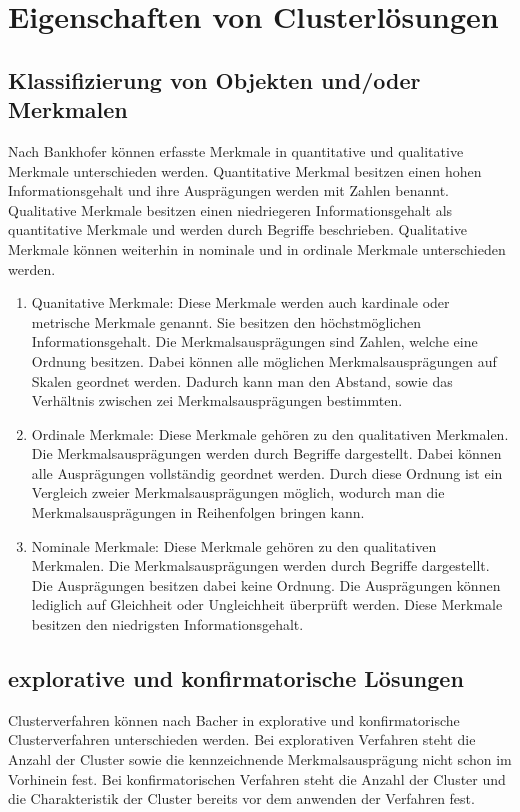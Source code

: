 \chapter{Eigenschaften von Clusterlösungen}

\section{Klassifizierung von Objekten und/oder Merkmalen}
Nach Bankhofer \cite{Bankhofer.2008} können erfasste Merkmale in quantitative und qualitative Merkmale unterschieden werden.
Quantitative Merkmal besitzen einen hohen Informationsgehalt und ihre Ausprägungen werden mit Zahlen benannt. Qualitative Merkmale besitzen einen niedriegeren Informationsgehalt als quantitative Merkmale und werden durch Begriffe beschrieben. Qualitative Merkmale können weiterhin in nominale und in ordinale Merkmale unterschieden werden.

\begin{enumerate}
        \item Quanitative Merkmale: Diese Merkmale werden auch kardinale oder metrische Merkmale genannt. Sie besitzen den höchstmöglichen Informationsgehalt. Die Merkmalsausprägungen sind Zahlen, welche eine Ordnung besitzen. Dabei können alle möglichen Merkmalsausprägungen auf Skalen geordnet werden. Dadurch kann man den Abstand, sowie das Verhältnis zwischen zei Merkmalsausprägungen bestimmten.
        \item Ordinale Merkmale: Diese Merkmale gehören zu den qualitativen Merkmalen. Die Merkmalsausprägungen werden durch Begriffe dargestellt. Dabei können alle Ausprägungen vollständig geordnet werden. Durch diese Ordnung ist ein Vergleich zweier Merkmalsausprägungen möglich, wodurch man die Merkmalsausprägungen in Reihenfolgen bringen kann.
        \item Nominale Merkmale: Diese Merkmale gehören zu den qualitativen Merkmalen. Die Merkmalsausprägungen werden durch Begriffe dargestellt. Die Ausprägungen besitzen dabei keine Ordnung. Die Ausprägungen können lediglich auf Gleichheit oder Ungleichheit überprüft werden. Diese Merkmale besitzen den niedrigsten Informationsgehalt.
\end{enumerate}

\section{explorative und konfirmatorische Lösungen}
Clusterverfahren können nach Bacher \cite{Bacher.2010} in explorative und konfirmatorische Clusterverfahren unterschieden werden. 
Bei explorativen Verfahren steht die Anzahl der Cluster sowie die kennzeichnende Merkmalsausprägung nicht schon im Vorhinein fest.
Bei konfirmatorischen Verfahren steht die Anzahl der Cluster und die Charakteristik der Cluster bereits vor dem anwenden der Verfahren fest.

